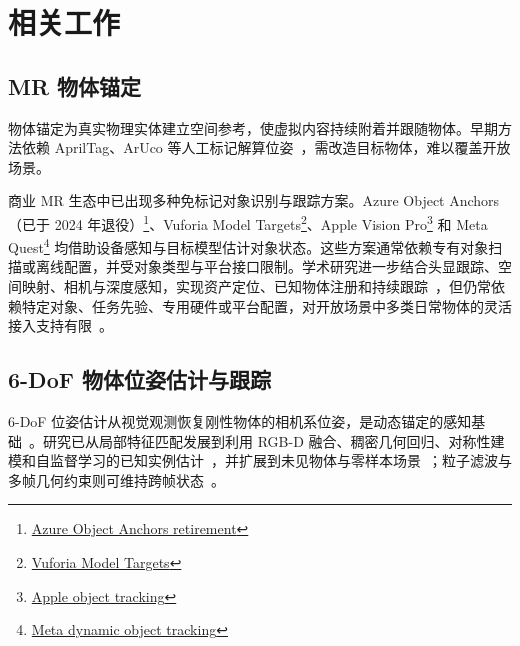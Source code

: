 \documentclass[review]{vgtc}
\begin{document}
\section{相关工作}\label{sec:related-work}

\subsection{MR 物体锚定}

物体锚定为真实物理实体建立空间参考，使虚拟内容持续附着并跟随物体。早期方法依赖 AprilTag、ArUco 等人工标记解算位姿~\cite{apriltag2011,aruco2014}，需改造目标物体，难以覆盖开放场景。

商业 MR 生态中已出现多种免标记对象识别与跟踪方案。Azure Object Anchors（已于 2024 年退役）\footnote{\href{https://learn.microsoft.com/en-us/lifecycle/end-of-support/end-of-support-2024}{Azure Object Anchors retirement}}、Vuforia Model Targets\footnote{\href{https://developer.vuforia.com/library/vuforia-engine/images-and-objects/model-targets/model-targets/}{Vuforia Model Targets}}、Apple Vision Pro\footnote{\href{https://developer.apple.com/documentation/visionos/implementing-object-tracking-in-your-app}{Apple object tracking}} 和 Meta Quest\footnote{\href{https://developers.meta.com/horizon/documentation/native/android/mobile-dynamic-object-tracker/}{Meta dynamic object tracking}} 均借助设备感知与目标模型估计对象状态。这些方案通常依赖专有对象扫描或离线配置，并受对象类型与平台接口限制。学术研究进一步结合头显跟踪、空间映射、相机与深度感知，实现资产定位、已知物体注册和持续跟踪~\cite{fan2021assettracking,doughty2022hmdegopose,pollabauer2023hololens,martingomez2024sttar,trojak2025mixedpose,greene2025markerless,trojak2026markerless,gbot2024}，但仍常依赖特定对象、任务先验、专用硬件或平台配置，对开放场景中多类日常物体的灵活接入支持有限~\cite{hurt2025surrealitycv}。

\subsection{6-DoF 物体位姿估计与跟踪}

6-DoF 位姿估计从视觉观测恢复刚性物体的相机系位姿，是动态锚定的感知基础~\cite{aguirrezabal2026survey}。研究已从局部特征匹配发展到利用 RGB-D 融合、稠密几何回归、对称性建模和自监督学习的已知实例估计~\cite{densefusion2019,epos2020,gdrnet2021,self6d2020}，并扩展到未见物体与零样本场景~\cite{gen6d2022,megapose2022,lin2024sam6d,ornek2024foundpose,moon2025coop,foundationpose2024}；粒子滤波与多帧几何约束则可维持跨帧状态~\cite{poserbpf2021,bundletrack2021}。
\end{document}
